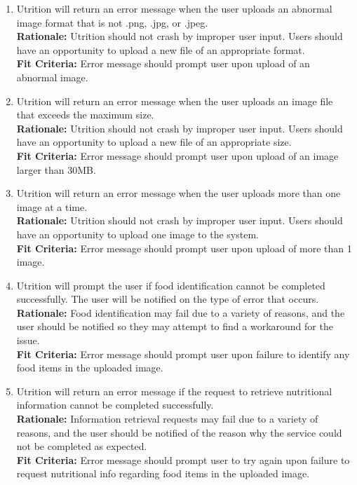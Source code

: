 \documentclass[12pt]{article}
\begin{document}
\begin{enumerate}[start=4,label={PR\arabic*.}]
	\item Utrition will return an error message when the user uploads an abnormal 
	image format that is not .png, .jpg, or .jpeg. \\
	\textbf{Rationale:}  Utrition should not crash by improper user 
	input. Users should have an opportunity to upload a new file of an appropriate 
	format.\\	
	\textbf{Fit Criteria:} Error message should prompt user upon upload of an abnormal 
	image.
	
	\item Utrition will return an error message when the user uploads an image file 
	that exceeds the maximum size. \\
	\textbf{Rationale:}  Utrition should not crash by improper user 
	input. Users should have an opportunity to upload a new file of an appropriate 
	size.\\	
	\textbf{Fit Criteria:} Error message should prompt user upon upload of an image 
	larger than 30MB.
	
	\item Utrition will return an error message when the user uploads more than one image at a time. \\
	\textbf{Rationale:}  Utrition should not crash by improper user 
	input. Users should have an opportunity to upload one image to the system.\\	
	\textbf{Fit Criteria:} Error message should prompt user upon upload of more than 1 
	image.
	
	\item Utrition will prompt the user if food identification cannot 
	be completed successfully. The user will be notified on the type of error 
	that occurs. \\
	\textbf{Rationale:}  Food identification may fail due to a variety of 
	reasons, and the user should be notified so they may attempt to find a  
	workaround for the issue. \\	
	\textbf{Fit Criteria:} Error message should prompt user upon failure to identify 
	any food items in the uploaded image.
	
	\item Utrition will return an error message if the request to retrieve 
	nutritional information cannot be completed successfully. \\
	\textbf{Rationale:}  Information retrieval requests may fail due to a 
	variety of reasons, and the user should be notified of the reason why the 
	service could not be completed as expected.\\	
	\textbf{Fit Criteria:} Error message should prompt user to try again upon failure 
	to request nutritional info regarding food items in the uploaded image.
	

\end{enumerate}
\end{document}
